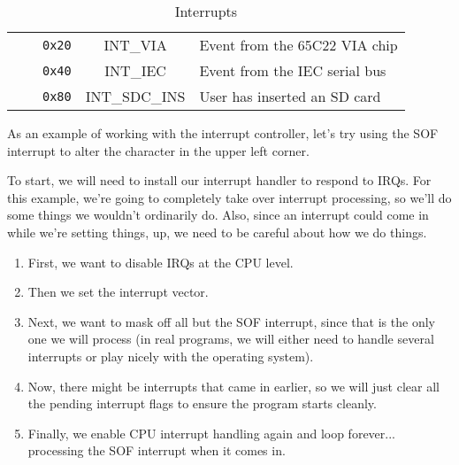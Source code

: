 \begin{table}[ht]
\begin{center}
\begin{tabular}{| c | c | c | c | l |}
            & & \verb+0x20+ & INT\_VIA & Event from the 65C22 VIA chip \\ \cline{3-5}

            & & \verb+0x40+ & INT\_IEC & Event from the IEC serial bus \\ \cline{3-5}

            & & \verb+0x80+ & INT\_SDC\_INS & User has inserted an SD card \\ \hline
        \end{tabular}
    \end{center}
	\caption{Interrupts}
	\label{tab:interrupts}
\end{table}

As an example of working with the interrupt controller, let's try using the SOF interrupt to alter the character in the upper left corner.

To start, we will need to install our interrupt handler to respond to IRQs. For this example, we're going to completely take over interrupt processing, so we'll do some things we wouldn't ordinarily do. Also, since an interrupt could come in while we're setting things, up, we need to be careful about how we do things.

\begin{enumerate}
    \item First, we want to disable IRQs at the CPU level.
    \item Then we set the interrupt vector.
    \item Next, we want to mask off all but the SOF interrupt, since that is the only one we will process (in real programs, we will either need to handle several interrupts or play nicely with the operating system).
    \item Now, there might be interrupts that came in earlier, so we will just clear all the pending interrupt flags to ensure the program starts cleanly.
    \item Finally, we enable CPU interrupt handling again and loop forever... processing the SOF interrupt when it comes in.
\end{enumerate}

